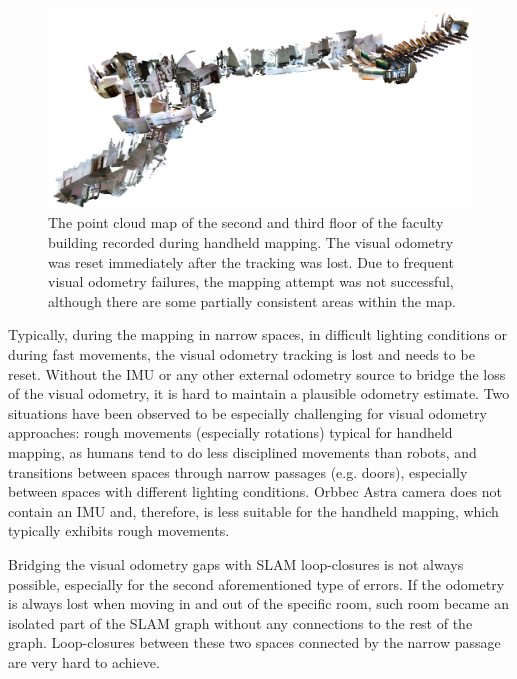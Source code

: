\begin{figure}
    \centering
    \includegraphics[width=\textwidth]{../img/mff_second_third_floor.png}
    \caption[A broken point cloud map of multiple campus floors]{The point cloud map of the second and third floor of the faculty building recorded during handheld mapping. The visual odometry was reset immediately after the tracking was lost. Due to frequent visual odometry failures, the mapping attempt was not successful, although there are some partially consistent areas within the map.}
    \label{fig:mff_second_third_floor}
\end{figure}

Typically, during the mapping in narrow spaces, in difficult lighting conditions or during fast movements, the visual odometry tracking is lost and needs to be reset. Without the \gls{IMU} or any other external odometry source to bridge the loss of the visual odometry, it is hard to maintain a plausible odometry estimate. Two situations have been observed to be especially challenging for visual odometry approaches: rough movements (especially rotations) typical for handheld mapping, as humans tend to do less disciplined movements than robots, and transitions between spaces through narrow passages (e.g. doors), especially between spaces with different lighting conditions. Orbbec Astra camera does not contain an \gls{IMU} and, therefore, is less suitable for the handheld mapping, which typically exhibits rough movements.

Bridging the visual odometry gaps with \gls{SLAM} loop-closures is not always possible, especially for the second aforementioned type of errors. If the odometry is always lost when moving in and out of the specific room, such room became an isolated part of the \gls{SLAM} graph without any connections to the rest of the graph. Loop-closures between these two spaces connected by the narrow passage are very hard to achieve.

